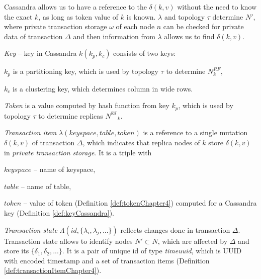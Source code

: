 \documentclass[runningheads,a4paper]{llncs}
\newcommand{\transaction}{$\Delta$\xspace}
\newcommand{\NRF}{\mathit{N^{\mathbb{RF}}}}
\newcommand{\mutation}[2]{$\delta(#1, #2)$\xspace}
\newcommand{\mutations}{$\{\delta_{1}, \delta_{2}, ...\}$\xspace}
\newcommand{\topology}{$\tau$\xspace}
\newcommand{\txItem}{$\lambda$\xspace}
\newcommand{\txStorage}{$\omega$\xspace}
\begin{document}
Cassandra allows us to have a reference to the \mutation{k}{v} without the need to know the exact $k$, as long as token value of $k$ is known. \txItem and topology \topology determine $N'$, where private transaction storage \txStorage of each node $n$ can be checked for private data of transaction \transaction and then information from \txItem allows us to find \mutation{k}{v}.

\begin{definition}
\label{def:keyCassandra}
\emph{Key} -- key in Cassandra $k(k_p,k_c)$ consists of two keys: 
\begin{enumerate*}[label=\alph*)]
\item $k_p$ is a partitioning key, which is used by topology \topology to determine $\mathit{N}^{RF}_k$,
\item $k_c$ is a clustering key, which determines column in wide rows.
\end{enumerate*}
\end{definition}


\begin{definition}
\label{def:tokenChapter4}
\emph{Token} is a value computed by hash function from key $k_p$, which is used by topology \topology to determine replicas $\NRF_k$.
\end{definition}

\begin{definition}
\label{def:transactionItemChapter4}
\emph{Transaction item} $\lambda(\mathit{keyspace}, \mathit{table}, \mathit{token})$ 
is a reference to a single mutation \mutation{k}{v} of transaction \transaction, which indicates that replica nodes of $k$ store \mutation{k}{v} in \emph{private transaction storage}.  
It is a triple with \begin{enumerate*}[label=\alph*)]
\item $\mathit{keyspace}$ -- name of keyspace,
\item $\mathit{table}$ -- name of table,
\item $\mathit{token}$ -- value of token (Definition \ref{def:tokenChapter4}) computed for a Cassandra key (Definition \ref{def:keyCassandra}).
\end{enumerate*}
\end{definition}

\begin{definition}
\label{def:transactionStateChapter4}
\emph{Transaction state} $\Lambda(\mathit{id}, \{\lambda_{i}, \lambda_{j}, ...\})$ reflects changes done in transaction \transaction. Transaction state allows to identify nodes $N' \subset N$, which are affected by \transaction and store its \mutations. It is a pair of unique id of type \emph{timeuuid}, which is UUID with encoded timestamp \cite{CassandraUUID} and a set of transaction items (Definition \ref{def:transactionItemChapter4}).
\end{definition}
\end{document}
